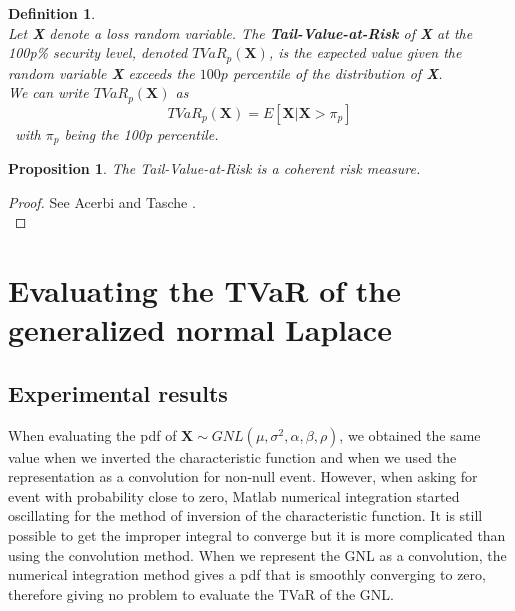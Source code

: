 \documentclass[12pt,travaildirige,nobabel, twoside]{dms}
\numberwithin{equation}{section}
\numberwithin{table}{chapter}
\numberwithin{figure}{chapter}
\newtheorem{mydef}{Definition}[section]
\newtheorem{proposition}{Proposition}[section]
\begin{document}
\begin{mydef}\leavevmode \\
Let \textbf{X} denote a loss random variable. The \textbf{Tail-Value-at-Risk} of \textbf{X} at the 100p\% security level, denoted \begin{math}TVaR_p(\textbf{X})\end{math}, is the expected value given the random variable \textbf{X} exceeds the $100p$ percentile of the distribution of \textbf{X}.\\
We can write \begin{math}TVaR_p(\textbf{X})\end{math} as\\
\begin{equation}TVaR_p(\textbf{X})=E[\textbf{X}| \textbf{X}>\pi_p ]\end{equation} \,           
with \begin{math}\pi_p \end{math} being the 100p percentile\nocite{lossmodel}.\\
\end{mydef}

\begin{proposition}
The Tail-Value-at-Risk is a coherent risk measure.\\
\end{proposition}

\begin{proof}
See Acerbi and Tasche \citep{coheranceTVAR}.\\
\end{proof}


\chapter{Evaluating the TVaR of the generalized normal Laplace}

\section{Experimental results}

When evaluating the pdf of  $\textbf{X}\sim GNL(\mu,\sigma^2,\alpha,\beta,\rho)$, we obtained the same value when we inverted the characteristic function and when we used the representation as a convolution for non-null event. However, when asking for event with probability close to zero, Matlab numerical integration started oscillating for the method of inversion of the characteristic function. It is still possible to get the improper integral to converge but it is more complicated than using the convolution method. When we represent the GNL as a convolution, the numerical integration method gives a pdf that is smoothly converging to zero, therefore giving no problem to evaluate the TVaR of the GNL.\\
\end{document}
